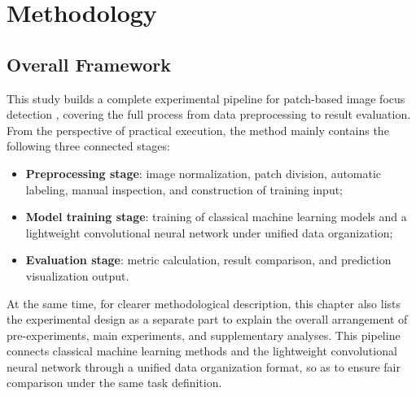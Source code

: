\chapter{Methodology}
\section{Overall Framework}
\par This study builds a complete experimental pipeline for patch-based image
focus detection \cite{Hou_2016_CVPR}, covering the full process from data
preprocessing to result evaluation. From the perspective of practical
execution, the method mainly contains the following three connected stages:
\begin{itemize}
    \item \textbf{Preprocessing stage}: image normalization, patch division,
    automatic labeling, manual inspection, and construction of training input;
    \item \textbf{Model training stage}: training of classical machine learning
    models and a lightweight convolutional neural network under unified data
    organization;
    \item \textbf{Evaluation stage}: metric calculation, result comparison, and
    prediction visualization output.
\end{itemize}
\par At the same time, for clearer methodological description, this chapter
also lists the experimental design as a separate part to explain the overall
arrangement of pre-experiments, main experiments, and supplementary analyses.
This pipeline connects classical machine learning methods and the lightweight
convolutional neural network through a unified data organization format, so as
to ensure fair comparison under the same task definition.

